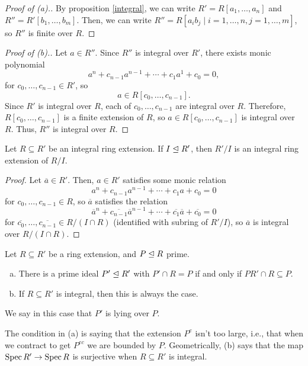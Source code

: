 \documentclass[12pt]{article}
\begin{document}
\begin{proof}[Proof of (a).]
    By proposition \ref{integral}, we can write $R'=R[a_1,\dots,a_n]$ and $R''=R'[b_1,\dots,b_m]$. Then, we can write $R''=R[a_ib_j \mid i=1,\dots,n, j=1,\dots,m]$, so $R''$ is finite over $R$.
\end{proof}

\begin{proof}[Proof of (b).]
    Let $a\in R''$. Since $R''$ is integral over $R'$, there exists monic polynomial
    \[a^n + c_{n-1} a^{n-1} + \cdots + c_1 a^1 + c_0 = 0,\]
    for $c_0,\dots,c_{n-1} \in R'$, so
    \[a\in R[c_0,\dots,c_{n-1}].\]
    Since $R'$ is integral over $R$, each of $c_0,\dots,c_{n-1}$ are integral over $R$. Therefore, $R[c_0,\dots,c_{n-1}]$ is a finite extension of $R$, so $a\in R[c_0,\dots,c_{n-1}]$ is integral over $R$. Thus, $R''$ is integral over $R$.
\end{proof}

\begin{lem}\label{intquot}
    Let $R\subseteq R'$ be an integral ring extension. If $I\trianglelefteq R'$, then $R'/I$ is an integral ring extension of $R/I$.
\end{lem}

\begin{proof}
    Let $\overline{a}\in R'$. Then, $a\in R'$ satisfies some monic relation
    \[a^n + c_{n-1}a^{n-1} + \cdots + c_1 a + c_0 = 0\]
    for $c_0,\dots,c_{n-1}\in R$, so $\overline{a}$ satisfies the relation
    \[\overline{a}^n + \overline{c_{n-1}}\overline{a}^{n-1} + \cdots + \overline{c_1} \overline{a} + \overline{c_0} = 0\]
    for $\overline{c_0},\dots,\overline{c_{n-1}} \in R/(I\cap R)$ (identified with subring of $R'/I$), so $\overline{a}$ is integral over $R/(I\cap R)$.
\end{proof}

\begin{prop}\label{lyingover}
    Let $R\subseteq R'$ be a ring extension, and $P\trianglelefteq R$ prime.
    \begin{enumerate}[(a)]
        \item There is a prime ideal $P'\trianglelefteq R'$ with $P'\cap R = P$ if and only if $PR' \cap R \subseteq P$.
        \item If $R\subseteq R'$ is integral, then this is always the case.
    \end{enumerate}
    We say in this case that $P'$ is lying over $P$.
\end{prop}

The condition in (a) is saying that the extension $P^e$ isn't too large, i.e., that when we contract to get $P^{ec}$ we are bounded by $P$. Geometrically, (b) says that the map $\operatorname{Spec} R' \to \operatorname{Spec} R$ is surjective when $R\subseteq R'$ is integral.
\end{document}
